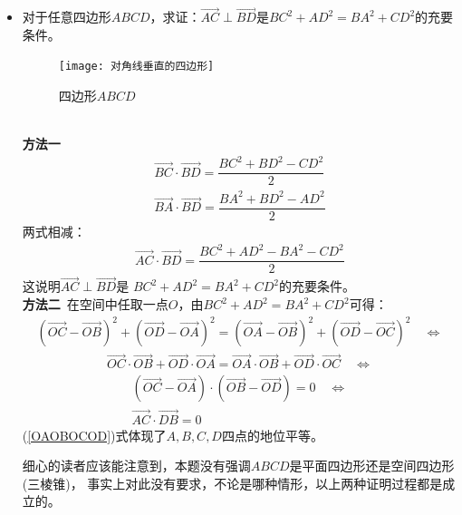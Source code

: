 \begin{itemize}[leftmargin=\inteval{\myitemleftmargin}pt,itemsep=
   \inteval{\myitemitempsep}pt,topsep=\inteval{\myitemtopsep}pt]
\item 对于任意四边形$ ABCD $，求证：$ \vec{AC}\perp
\vec{BD} $是$ BC^2+AD^2=BA^2+CD^2 $的充要条件。
\begin{figure}[h]
    \centering
    \texttt{[image: 对角线垂直的四边形]}
    \caption{四边形$ ABCD $}
    \label{图8-1四边形ABCD}
\end{figure} \\
\textbf{方法一}
\begin{align*}
    \vec{BC}\cdot\vec{BD}=\dfrac{BC^2+BD^2-CD^2}{2} \\
    \vec{BA}\cdot\vec{BD}=\dfrac{BA^2+BD^2-AD^2}{2} 
\end{align*}
两式相减：
\begin{align*}
    \vec{AC}\cdot\vec{BD}=\dfrac{BC^2+AD^2-BA^2-CD^2}{2}
\end{align*}
这说明$ \vec{AC}\perp \vec{BD} $是
$ BC^2+AD^2=BA^2+CD^2 $的充要条件。 \\
\textbf{方法二}\ 在空间中任取一点$ O $，由$ BC^2+AD^2=BA^2+CD^2 $可得：
\begin{gather*}
    (\vec{OC}-\vec{OB})^2 +
    (\vec{OD}-\vec{OA})^2 =
    (\vec{OA}-\vec{OB})^2 +
    (\vec{OD}-\vec{OC})^2  \quad \Leftrightarrow 	
\end{gather*}
\vspace{-0.8cm}
\begin{gather}\label{OAOBOCOD}
    \vec{OC}\cdot\vec{OB}+
    \vec{OD}\cdot\vec{OA}=
    \vec{OA}\cdot\vec{OB}+
    \vec{OD}\cdot\vec{OC} \quad \Leftrightarrow
\end{gather}
\vspace{-0.8cm}
\begin{gather*}	 
    (\vec{OC}-\vec{OA})
    \cdot(\vec{OB}-\vec{OD})=0 \quad \Leftrightarrow \\
    \vec{AC}\cdot\vec{DB}=0
\end{gather*}
(\ref{OAOBOCOD})式体现了$ A,B,C,D $四点的地位平等。

细心的读者应该能注意到，本题没有强调$ ABCD $是平面四边形还是空间四边形(三棱锥)，
事实上对此没有要求，不论是哪种情形，以上两种证明过程都是成立的。


\end{itemize}
